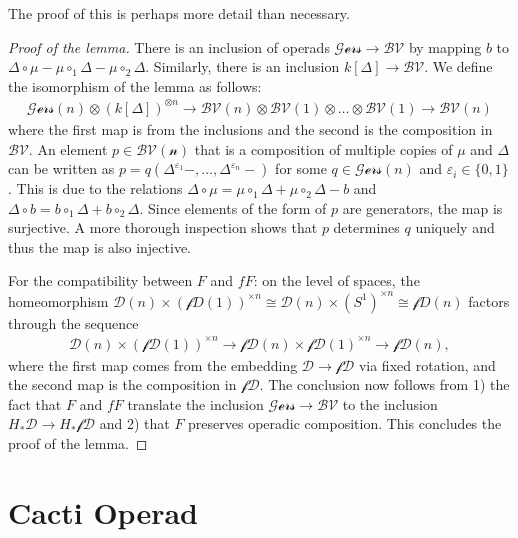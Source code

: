 \documentclass{scrartcl}
\theoremstyle{plain}
\theoremstyle{definition}
\renewcommand{\epsilon}{\varepsilon}
\newcommand{\blank}{-}
\newcommand{\comp}{\circ}
\begin{document}
The proof of this is perhaps more detail than necessary. 

\begin{proof}[Proof of the lemma]
    There is an inclusion of operads $\mathcal {Gers}\to\mathcal {BV}$ by mapping $b$ to $\Delta\comp \mu - \mu\comp_1\Delta - \mu\comp_2\Delta$. Similarly, there is an inclusion $k[\Delta]\to\mathcal{BV}$. We define the isomorphism of the lemma as follows: \begin{align*}\mathcal{Gers}(n) \otimes {(k[\Delta])}^{\otimes n} \to \mathcal{BV}(n) \otimes \mathcal{BV}(1) \otimes \dots \otimes \mathcal{BV}(1) \to \mathcal{BV}(n)\end{align*} where the first map is from the inclusions and the second is the composition in $\mathcal{BV}$. An element $p\in\mathcal{BV(n)}$ that is a composition of multiple copies of $\mu$ and $\Delta$ can be written as $p = q(\Delta^{\epsilon_1}\blank, \dots, \Delta^{\epsilon_n}\blank)$ for some $q\in\mathcal{Gers}(n)$ and $\epsilon_i\in\{0, 1\}$. This is due to the relations $\Delta\comp \mu = \mu\comp_1\Delta + \mu\comp_2\Delta - b$ and $\Delta \comp b = b \comp_1 \Delta + b \comp_2 \Delta$. Since elements of the form of $p$ are generators, the map is surjective. A more thorough inspection shows that $p$ determines $q$ uniquely and thus the map is also injective. 
    
    For the compatibility between $F$ and $fF$: on the level of spaces, the homeomorphism $\mathcal D(n) \times {(\mathcal fD(1))}^{\times n} \cong \mathcal D(n) \times {(S^1)}^{\times n} \cong \mathcal fD(n)$ 
    factors through the sequence 
    \begin{align*}
        \mathcal D(n) \times {(\mathcal {fD}(1))}^{\times n} \to \mathcal {fD}(n) \times {}\mathcal{fD}{(1)}^{\times n} \to \mathcal{fD}(n),
    \end{align*} 
    where the first map comes from the embedding $\mathcal D \to \mathcal{fD}$ via fixed rotation, and the second map is the composition in $\mathcal{fD}$. The conclusion now follows from 1) the fact that $F$ and $fF$ translate the inclusion $\mathcal {Gers}\to\mathcal {BV}$ to the inclusion $H_*\mathcal{D} \to H_*\mathcal{fD}$ and 2) that $F$ preserves operadic composition. This concludes the proof of the lemma. 
\end{proof}



\section{Cacti Operad}
\end{document}
